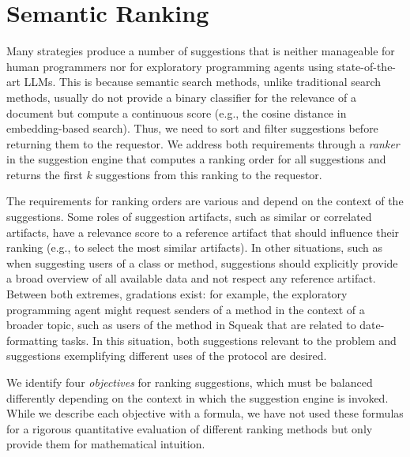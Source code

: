 
\section{Semantic Ranking}
\label{sec:suggestions/ranking}

Many strategies produce a number of suggestions that is neither manageable for human programmers nor for exploratory programming agents using state-of-the-art LLMs.
This is because semantic search methods, unlike traditional search methods, usually do not provide a binary classifier for the relevance of a document but compute a continuous score (e.g., the cosine distance in embedding-based search).
Thus, we need to sort and filter suggestions before returning them to the requestor.
We address both requirements through a \emph{ranker} in the suggestion engine that computes a ranking order for all suggestions and returns the first $k$ suggestions from this ranking to the requestor.

The requirements for ranking orders are various and depend on the context of the suggestions.
Some roles of suggestion artifacts, such as similar or correlated artifacts, have a relevance score to a reference artifact that should influence their ranking (e.g., to select the most similar artifacts).
In other situations, such as when suggesting users of a class or method, suggestions should explicitly provide a broad overview of all available data and not respect any reference artifact.
Between both extremes, gradations exist: for example, the exploratory programming agent might request senders of a method in the context of a broader topic, such as users of the  method in Squeak that are related to date-formatting tasks.
In this situation, both suggestions relevant to the problem and suggestions exemplifying different uses of the protocol are desired.

We identify four \emph{objectives} for ranking suggestions, which must be balanced differently depending on the context in which the suggestion engine is invoked.
While we describe each objective with a formula, we have not used these formulas for a rigorous quantitative evaluation of different ranking methods but only provide them for mathematical intuition.

